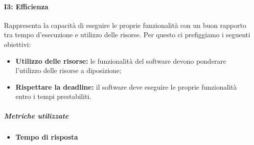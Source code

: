 \paragraph{\textbf{I3: Efficienza}}
Rappresenta la capacità di eseguire le proprie funzionalità con un buon rapporto tra tempo d'esecuzione e utilizzo delle risorse. Per questo ci prefiggiamo i seguenti obiettivi:
\begin{itemize}
	\item \textbf{Utilizzo delle risorse:} le funzionalità del software devono ponderare l'utilizzo delle risorse a diposizione;
	\item \textbf{Rispettare la deadline:} il software deve eseguire le proprie funzionalità entro i tempi prestabiliti.
\end{itemize}
\vspace{0.8cm}
\subparagraph{Metriche utilizzate}
\begin{itemize}
	\item \textbf{Tempo di risposta}
\end{itemize}
\begin{table}[!htpb]
	\centering
	\renewcommand{\arraystretch}{2} 
	\caption{Metriche utilizzate Efficienza}
\end{table}

